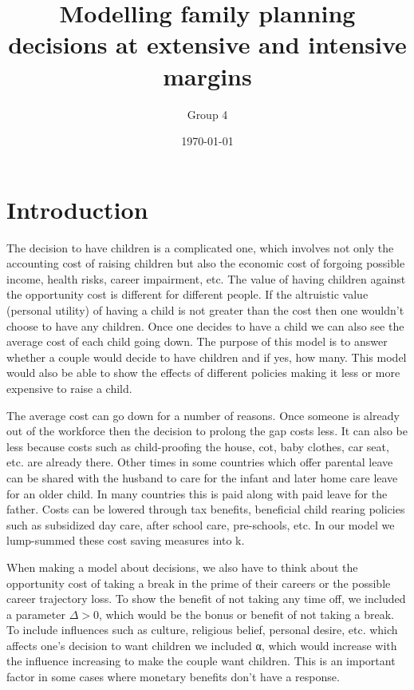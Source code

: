\documentclass{homework}
\author{Group 4}
\date{\today}
\title{Modelling family planning decisions at extensive and intensive margins}
\begin{document}
 \maketitle

\section{Introduction}


The decision to have children is a complicated one, which involves not only the accounting cost of raising children but also the economic cost of forgoing possible income, health risks, career impairment, etc. The value of having children against the opportunity cost is different for different people. If the altruistic value (personal utility) of having a child is not greater than the cost then one wouldn't choose to have any children. Once one decides to have a child we can also see the average cost of each child going down. The purpose of this model is to answer whether a couple would decide to have children and if yes, how many. This model would also be able to show the effects of different policies making it less or more expensive to raise a child.

The average cost can go down for a number of reasons. Once someone is already out of the workforce then the decision to prolong the gap costs less. It can also be less because costs such as child-proofing the house, cot, baby clothes, car seat, etc. are already there. Other times in some countries which offer parental leave can be shared with the husband to care for the infant and later home care leave for an older child. In many countries this is paid along with paid leave for the father. Costs can be lowered through tax benefits, beneficial child rearing policies such as subsidized day care, after school care, pre-schools, etc. In our model we lump-summed these cost saving measures into k.

When making a model about decisions, we also have to think about the opportunity cost of taking a break in the prime of their careers or the possible career trajectory loss. To show the benefit of not taking any time off, we included a parameter $\Delta>0$, which would be the bonus or benefit of not taking a break. To include influences such as culture, religious belief, personal desire, etc. which affects one's decision to want children we included α, which would increase with the influence increasing to make the couple want children. This is an important factor in some cases where monetary benefits don’t have a response.
\end{document}
